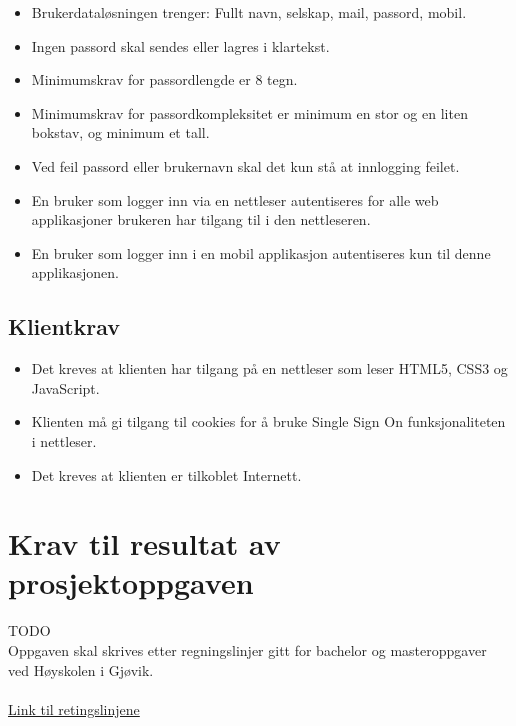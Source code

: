 \begin{itemize}
\item Brukerdataløsningen trenger: Fullt navn, selskap, mail, passord, mobil.
\item Ingen passord skal sendes eller lagres i klartekst.
\item Minimumskrav for passordlengde er 8 tegn.
\item Minimumskrav for passordkompleksitet er minimum en stor og en liten bokstav, og minimum et tall. 
\item Ved feil passord eller brukernavn skal det kun stå at innlogging feilet. 
\item En bruker som logger inn via en nettleser autentiseres for alle web applikasjoner brukeren har tilgang til i den nettleseren.
\item En bruker som logger inn i en mobil applikasjon autentiseres kun til denne applikasjonen.
\end{itemize}

\subsection{Klientkrav}
\label{subsec:kravspesifikasjon_operasjonelleKrav_klientkrav}
\begin{itemize}
\item Det kreves at klienten har tilgang på en nettleser som leser HTML5, CSS3 og JavaScript.
\item Klienten må gi tilgang til cookies for å bruke Single Sign On funksjonaliteten i nettleser.
\item Det kreves at klienten er tilkoblet Internett.
\end{itemize}


\section{Krav til resultat av prosjektoppgaven}
\label{sec:kravspesifikasjon_kravTilResultatAvProsjektoppgaven}
{\color{red}TODO}\\
Oppgaven skal skrives etter regningslinjer gitt for bachelor og masteroppgaver ved Høyskolen i Gjøvik.
\\
\\
\href{http://www.hig.no/content/download/30554/364363/file/Retningslinjer%20for%20mastergradsoppgaver%20og%20st%C3%B8rre%20studentoppgaver%20p%C3%A5%20bachelorniv%C3%A5%20ved%20H%C3%B8gskolen%20i%20Gj%C3%B8vik_des2010_v1201.pdf}{Link til retingslinjene}